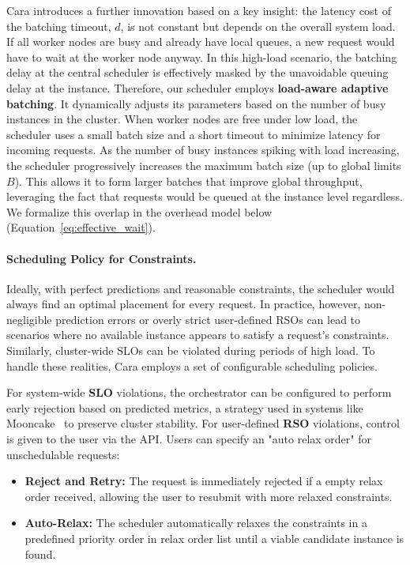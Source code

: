 \documentclass[letterpaper, anonymous, twocolumn, 10pt]{article}
\begin{document}
Cara introduces a further innovation based on a key insight: the latency cost of the batching timeout, $d$, is not constant but depends on the overall system load. If all worker nodes are busy and already have local queues, a new request would have to wait at the worker node anyway. In this high-load scenario, the batching delay at the central scheduler is effectively masked by the unavoidable queuing delay at the instance. Therefore, our scheduler employs \textbf{load-aware adaptive batching}. It dynamically adjusts its parameters based on the number of busy instances in the cluster. When worker nodes are free under low load, the scheduler uses a small batch size and a short timeout to minimize latency for incoming requests. As the number of busy instances spiking with load increasing, the scheduler progressively increases the maximum batch size (up to global limits $B$). This allows it to form larger batches that improve global throughput, leveraging the fact that requests would be queued at the instance level regardless. We formalize this overlap in the overhead model below (Equation~\ref{eq:effective_wait}).

\paragraph{Scheduling Policy for Constraints.}
Ideally, with perfect predictions and reasonable constraints, the scheduler would always find an optimal placement for every request. In practice, however, non-negligible prediction errors or overly strict user-defined RSOs can lead to scenarios where no available instance appears to satisfy a request's constraints. Similarly, cluster-wide SLOs can be violated during periods of high load. To handle these realities, Cara employs a set of configurable scheduling policies.

For system-wide \textbf{SLO} violations, the orchestrator can be configured to perform early rejection based on predicted metrics, a strategy used in systems like Mooncake~\cite{qin_mooncake_2024} to preserve cluster stability. For user-defined \textbf{RSO} violations, control is given to the user via the API. Users can specify an "auto relax order" for unschedulable requests:
\begin{itemize}
    \item \textbf{Reject and Retry:} The request is immediately rejected if a empty relax order received, allowing the user to resubmit with more relaxed constraints.
    \item \textbf{Auto-Relax:} The scheduler automatically relaxes the constraints in a predefined priority order in relax order list until a viable candidate instance is found.
\end{itemize}
\end{document}
